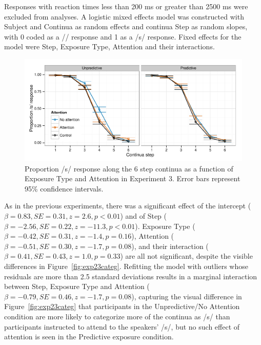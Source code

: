 Responses with reaction times less than 200 ms or greater than 2500 ms were excluded from analyses. 
A logistic mixed effects model was constructed with Subject and Continua as random effects and continua Step as random slopes, with 0 coded as a /\textesh/ response and 1 as a /s/ response.  Fixed effects for the model were Step, Exposure Type, Attention and their interactions.


\begin{figure}[!ht]
\caption{Proportion /s/ response along the 6 step continua as a function of Exposure Type and Attention in Experiment 3.  Error bars represent 95\% confidence intervals.}
\label{fig:exp3categ}
\begin{center}
\includegraphics[width=\textwidth]{graphs/exp3_categresults}
\end{center}
\end{figure}

As in the previous experiments, there was a significant effect of the intercept ($\beta = 0.83, SE = 0.31, z = 2.6, p < 0.01$) and of Step ($\beta = -2.56, SE = 0.22, z = -11.3, p < 0.01$).
Exposure Type ($\beta = -0.42, SE = 0.31, z = -1.4, p = 0.16$), Attention ($\beta = -0.51, SE = 0.30, z = -1.7, p = 0.08$), and their interaction ($\beta = 0.41, SE = 0.43, z = 1.0, p = 0.33$) are all not significant, despite the visible differences in Figure~\ref{fig:exp23categ}.  Refitting the model with outliers whose residuals are more than 2.5 standard deviations results in a marginal interaction between Step, Exposure Type and Attention ($\beta = -0.79, SE = 0.46, z = -1.7, p = 0.08$), capturing the visual difference in Figure~\ref{fig:exp23categ} that participants in the Unpredictive/No Attention condition are more likely to categorize more of the continua as /s/ than participants instructed to attend to the speakers' /s/, but no such effect of attention is seen in the Predictive exposure condition. 


